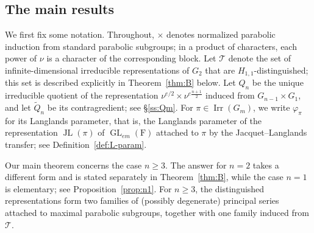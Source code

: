 \documentclass[11pt]{amsart}
\numberwithin{equation}{section}
\theoremstyle{plain}
\theoremstyle{definition}
\theoremstyle{remark}
\newcommand{\T}{\mathcal{T}}
\DeclareMathOperator{\GL}{GL}
\DeclareMathOperator{\Irr}{Irr}
\DeclareMathOperator{\JL}{JL}
\newcommand{\Qt}{\widetilde{Q}}
\begin{document}
\subsection{The main results}

We first fix some notation. Throughout, $\times$ denotes normalized parabolic induction from standard parabolic subgroups; in a product of characters, each power of $\nu$ is a character of the corresponding block. Let $\T$ denote the set of infinite-dimensional irreducible representations of $G_2$ that are $H_{1,1}$-distinguished; this set is described explicitly in Theorem~\ref{thm:B} below. Let $Q_n$ be the unique irreducible quotient of the representation $\nu^{e/2}\times\nu^{e\frac{n+1}2}$ induced from $G_{n-1}\times G_1$, and let $\Qt_n$ be its contragredient; see \S\ref{ss:Qm}. For $\pi\in\Irr(G_m)$, we write $\varphi_\pi$ for its Langlands parameter, that is, the Langlands parameter of the representation $\JL(\pi)$ of $\GL_{em}(\mathrm{F})$ attached to $\pi$ by the Jacquet--Langlands transfer; see Definition~\ref{def:L-param}.

Our main theorem concerns the case $n\ge3$. The answer for $n=2$ takes a different form and is stated separately in Theorem~\ref{thm:B}, while the case $n=1$ is elementary; see  Proposition~\ref{prop:n1}. For $n\ge3$, the distinguished representations form two families of (possibly degenerate) principal series attached to maximal parabolic subgroups, together with one family induced from $\T$.
\end{document}
